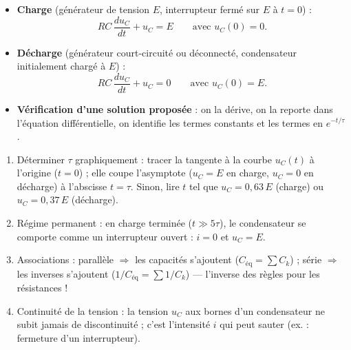 \documentclass[11pt]{article}
\newcommand{\cle}[1]{{\popxbold\color{popdark}#1}}
\begin{document}
\begin{propriete}
\begin{itemize}
  \item \textbf{Charge} (générateur de tension $E$, interrupteur fermé sur $E$ à $t=0$) : 
  \[ RC\,\dfrac{du_C}{dt} + u_C = E \qquad\text{avec } u_C(0)=0. \]
  \item \textbf{Décharge} (générateur court-circuité ou déconnecté, condensateur initialement chargé à $E$) : 
  \[ RC\,\dfrac{du_C}{dt} + u_C = 0 \qquad\text{avec } u_C(0)=E. \]
  \item \textbf{Vérification d'une solution proposée} : on la dérive, on la reporte dans l'équation différentielle, on identifie les termes constants et les termes en $e^{-t/\tau}$.
\end{itemize}
\end{propriete}

\begin{methode}
\begin{enumerate}
  \item \cle{Déterminer $\tau$ graphiquement} : tracer la tangente à la courbe $u_C(t)$ à l'origine ($t=0$) ; elle coupe l'asymptote ($u_C = E$ en charge, $u_C = 0$ en décharge) à l'abscisse $t = \tau$. Sinon, lire $t$ tel que $u_C = 0{,}63\,E$ (charge) ou $u_C = 0{,}37\,E$ (décharge).
  \item \cle{Régime permanent} : en charge terminée ($t \gg 5\tau$), le condensateur se comporte comme un interrupteur ouvert : $i = 0$ et $u_C = E$.
  \item \cle{Associations} : parallèle $\Rightarrow$ les capacités s'ajoutent ($C_{\text{éq}} = \sum C_k$) ; série $\Rightarrow$ les inverses s'ajoutent ($1/C_{\text{éq}} = \sum 1/C_k$) — l'inverse des règles pour les résistances !
  \item \cle{Continuité de la tension} : la tension $u_C$ aux bornes d'un condensateur ne subit jamais de discontinuité ; c'est l'intensité $i$ qui peut sauter (ex. : fermeture d'un interrupteur).
\end{enumerate}
\end{methode}
\end{document}
